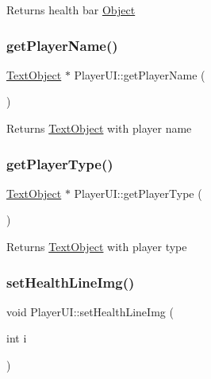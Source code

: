 \begin{DoxyReturn}{Returns}
health bar \hyperlink{class_object}{Object} 
\end{DoxyReturn}
\mbox{\label{class_player_u_i_a757ad508c40877d30f9f8b45f8afeccf}} 
\subsubsection{\texorpdfstring{get\+Player\+Name()}{getPlayerName()}}
{\footnotesize\ttfamily \hyperlink{class_text_object}{Text\+Object} $\ast$ Player\+U\+I\+::get\+Player\+Name (\begin{DoxyParamCaption}{ }\end{DoxyParamCaption})}

\begin{DoxyReturn}{Returns}
\hyperlink{class_text_object}{Text\+Object} with player name 
\end{DoxyReturn}
\mbox{\label{class_player_u_i_a45451abaa9482efb72379df93c2ca37e}} 
\subsubsection{\texorpdfstring{get\+Player\+Type()}{getPlayerType()}}
{\footnotesize\ttfamily \hyperlink{class_text_object}{Text\+Object} $\ast$ Player\+U\+I\+::get\+Player\+Type (\begin{DoxyParamCaption}{ }\end{DoxyParamCaption})}

\begin{DoxyReturn}{Returns}
\hyperlink{class_text_object}{Text\+Object} with player type 
\end{DoxyReturn}
\mbox{\label{class_player_u_i_a5cb795f694ec795a49591e6c3a7c7e64}} 
\subsubsection{\texorpdfstring{set\+Health\+Line\+Img()}{setHealthLineImg()}}
{\footnotesize\ttfamily void Player\+U\+I\+::set\+Health\+Line\+Img (\begin{DoxyParamCaption}\item[{int}]{i }\end{DoxyParamCaption})}



